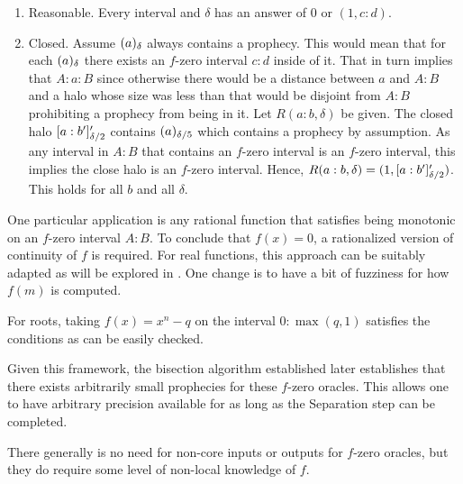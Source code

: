 \documentclass[12pt]{article}
\begin{document}
\begin{enumerate}
\item Reasonable. Every interval and $\delta$ has an answer of $0$ or $(1, c : d)$.

\item Closed. Assume $\halo{a}$ always contains a prophecy. This would mean that for each $\halo{a}$ there exists an $f$-zero interval $c:d$ inside of it. That in turn implies that $A : a: B$ since otherwise there would be a distance between $a$ and $A:B$ and a halo whose size was less than that would be disjoint from $A:B$ prohibiting a prophecy from being in it. Let $R(a:b, \delta)$ be given. The closed halo $\clhalo[\delta/2]{a:b'}'$ contains $\halo[\delta/5]{a}$ which contains a prophecy by assumption. As any interval in $A:B$ that contains an $f$-zero interval is an $f$-zero interval, this implies the close halo is an $f$-zero interval. Hence, $R(a:b, \delta) = (1, \clhalo[\delta/2]{a:b'}') $. This holds for all $b$ and all $\delta$.

\end{enumerate}

One particular application is any rational function that satisfies being monotonic on an $f$-zero interval $A:B$. To conclude that $f(x)=0$, a rationalized version of continuity of $f$ is required. For real functions, this approach can be suitably adapted as will be explored in \cite{taylor23funora}. One change is to have a bit of fuzziness for how $f(m)$ is computed. 

For roots, taking $f(x) = x^n - q$ on the interval $0:\max(q, 1)$ satisfies the conditions as can be easily checked. 

Given this framework, the bisection algorithm established later establishes that there exists arbitrarily small prophecies for these $f$-zero oracles. This allows one to have arbitrary precision available for as long as the Separation step can be completed. 

There generally is no need for non-core inputs or outputs for $f$-zero oracles, but they do require some level of non-local knowledge of $f$. 
\end{document}
